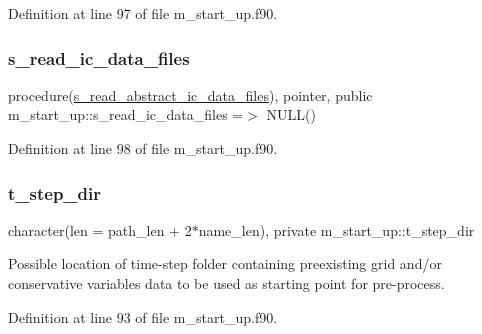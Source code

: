 Definition at line 97 of file m\+\_\+start\+\_\+up.\+f90.

\mbox{\label{namespacem__start__up_a7a35339ce3c84eaf721a80e77be63c07}} 
\subsubsection{\texorpdfstring{s\+\_\+read\+\_\+ic\+\_\+data\+\_\+files}{s\_read\_ic\_data\_files}}
{\footnotesize\ttfamily procedure(\hyperlink{interfacem__start__up_1_1s__read__abstract__ic__data__files}{s\+\_\+read\+\_\+abstract\+\_\+ic\+\_\+data\+\_\+files}), pointer, public m\+\_\+start\+\_\+up\+::s\+\_\+read\+\_\+ic\+\_\+data\+\_\+files =$>$ N\+U\+LL()}



Definition at line 98 of file m\+\_\+start\+\_\+up.\+f90.

\mbox{\label{namespacem__start__up_aa4d95a815bb7fb67f4717f93e906e605}} 
\subsubsection{\texorpdfstring{t\+\_\+step\+\_\+dir}{t\_step\_dir}}
{\footnotesize\ttfamily character(len = path\+\_\+len + 2$\ast$name\+\_\+len), private m\+\_\+start\+\_\+up\+::t\+\_\+step\+\_\+dir\hspace{0.3cm}{\ttfamily [private]}}



Possible location of time-\/step folder containing preexisting grid and/or conservative variables data to be used as starting point for pre-\/process. 



Definition at line 93 of file m\+\_\+start\+\_\+up.\+f90.

